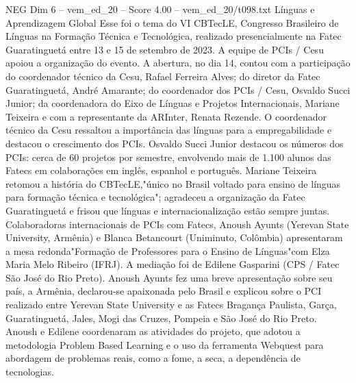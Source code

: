 \begin{textsample}{NEG Dim 6 – vem\_ed\_20 – Score 4.00 – vem\_ed\_20/t098.txt}  \label{ex:f6_neg_133}
Línguas e Aprendizagem Global Esse foi o tema do VI CBTecLE, Congresso Brasileiro de Línguas na Formação Técnica e Tecnológica, realizado presencialmente na Fatec Guaratinguetá entre 13 e 15 de setembro de 2023.
A equipe de PCIs / Cesu apoiou a organização do evento.
A abertura, no dia 14, contou com a participação do coordenador técnico da Cesu, Rafael Ferreira Alves; do diretor da Fatec Guaratinguetá, André Amarante; do coordenador dos PCIs / Cesu, Osvaldo Succi Junior; da coordenadora do Eixo de Línguas e Projetos Internacionais, Mariane Teixeira e com a representante da ARInter, Renata Rezende.
O coordenador técnico da Cesu ressaltou a importância das línguas para a empregabilidade e destacou o crescimento dos PCIs.
Osvaldo Succi Junior destacou os números dos PCIs: cerca de 60 projetos por semestre, envolvendo mais de 1.100 alunos das Fatecs em colaborações em inglês, espanhol e português.
Mariane Teixeira retomou a história do CBTecLE,"único no Brasil voltado para ensino de línguas para formação técnica e tecnológica"; agradeceu a organização da Fatec Guaratinguetá e frisou que línguas e internacionalização estão sempre juntas.
Colaboradoras internacionais de PCIs com Fatecs, Anoush Ayunts (Yerevan State University, Armênia) e Blanca Betancourt (Uniminuto, Colômbia) apresentaram a mesa redonda"Formação de Professores para o Ensino de Línguas"com Elza Maria Melo Ribeiro (IFRJ).
A mediação foi de Edilene Gasparini (CPS / Fatec São José do Rio Preto).
Anoush Ayunts fez uma breve apresentação sobre seu país, a Armênia, declarou-se apaixonada pelo Brasil e explicou sobre o PCI realizado entre Yerevan State University e as Fatecs Bragança Paulista, Garça, Guaratinguetá, Jales, Mogi das Cruzes, Pompeia e São José do Rio Preto.
Anoush e Edilene coordenaram as atividades do projeto, que adotou a metodologia Problem Based Learning e o uso da ferramenta Webquest para abordagem de problemas reais, como a fome, a seca, a dependência de tecnologias.

\end{textsample}
